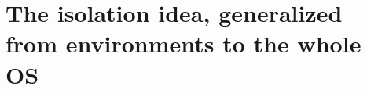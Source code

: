 \chapter{The isolation idea, generalized from environments to the whole OS}
\label{ch:the-isolation-idea-generalized-from}

